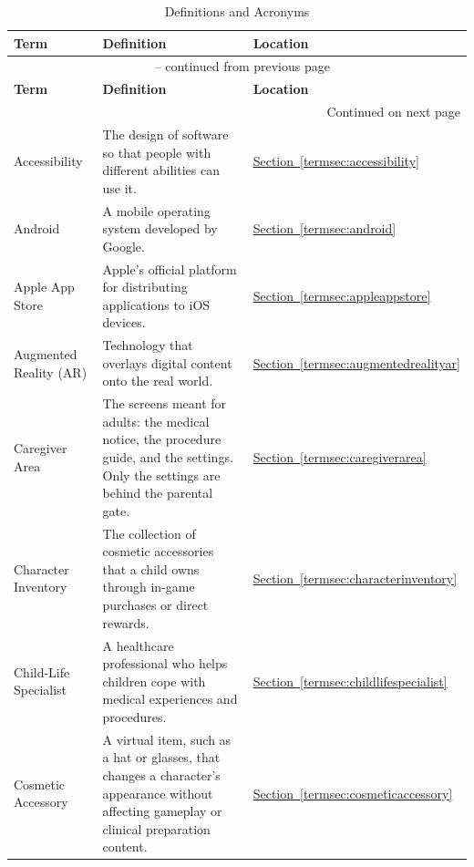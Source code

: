 \documentclass[10pt]{article}
\newcommand{\termloc}[1]{\hyperlink{term:#1}{Section~\ref*{termsec:#1}}}
\begin{document}
\begin{longtable}{@{}p{} p{} p{}@{}}
\caption{Definitions and Acronyms}
\label{tab:DefinitionsAndAcronyms}\\

\toprule
\textbf{Term} & \textbf{Definition} & \textbf{Location} \\
\midrule
\endfirsthead

\multicolumn{3}{c}{\tablename\ \thetable{} -- continued from previous page} \\
\toprule
\textbf{Term} & \textbf{Definition} & \textbf{Location} \\
\midrule
\endhead

\midrule
\multicolumn{3}{r}{Continued on next page} \\
\endfoot

\bottomrule
\endlastfoot

Accessibility &
The design of software so that people with different abilities can use it. &
\termloc{accessibility} \\

Android &
A mobile operating system developed by Google. &
\termloc{android} \\

Apple App Store &
Apple's official platform for distributing applications to iOS devices. &
\termloc{appleappstore} \\

Augmented Reality (AR) &
Technology that overlays digital content onto the real world. &
\termloc{augmentedrealityar} \\

Caregiver Area &
The screens meant for adults: the medical notice, the procedure guide, and the settings. Only the settings are behind the parental gate. &
\termloc{caregiverarea} \\

Character Inventory &
The collection of cosmetic accessories that a child owns through in-game purchases or direct rewards. &
\termloc{characterinventory} \\

Child-Life Specialist &
A healthcare professional who helps children cope with medical experiences and procedures. &
\termloc{childlifespecialist} \\

Cosmetic Accessory &
A virtual item, such as a hat or glasses, that changes a character's appearance without affecting gameplay or clinical preparation content. &
\termloc{cosmeticaccessory} \\


\end{longtable}
\end{document}
